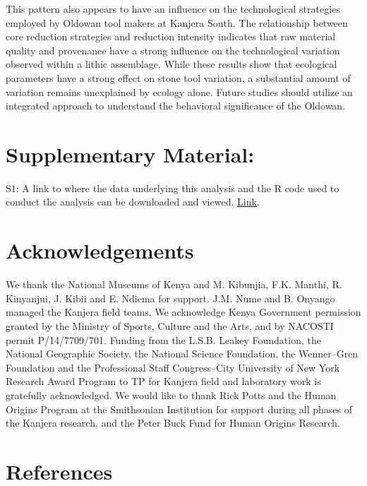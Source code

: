 \documentclass[]{elsarticle} %
\begin{document}
This pattern also appears to have an influence on the technological
strategies employed by Oldowan tool makers at Kanjera South. The
relationship between core reduction strategies and reduction intensity
indicates that raw material quality and provenance have a strong
influence on the technological variation observed within a lithic
assemblage. While these results show that ecological parameters have a
strong effect on stone tool variation, a substantial amount of variation
remains unexplained by ecology alone. Future studies should utilize an
integrated approach to understand the behavioral significance of the
Oldowan.

\hypertarget{supplementary-material}{%
\section{Supplementary Material:}\label{supplementary-material}}

S1: A link to where the data underlying this analysis and the R code
used to conduct the analysis can be downloaded and viewed.
\href{https://www.dropbox.com/home/Models_and_Runs/Kanjera\%20South}{Link}.

\hypertarget{acknowledgements}{%
\section{Acknowledgements}\label{acknowledgements}}

We thank the National Museums of Kenya and M. Kibunjia, F.K. Manthi, R.
Kinyanjui, J. Kibii and E. Ndiema for support. J.M. Nume and B. Onyango
managed the Kanjera field teams. We acknowledge Kenya Government
permission granted by the Ministry of Sports, Culture and the Arts, and
by NACOSTI permit P/14/7709/701. Funding from the L.S.B. Leakey
Foundation, the National Geographic Society, the National Science
Foundation, the Wenner--Gren Foundation and the Professional Staff
Congress--City University of New York Research Award Program to TP for
Kanjera field and laboratory work is gratefully acknowledged. We would
like to thank Rick Potts and the Human Origins Program at the
Smithsonian Institution for support during all phases of the Kanjera
research, and the Peter Buck Fund for Human Origins Research.

\hypertarget{references}{%
\section{References}\label{references}}
\end{document}
